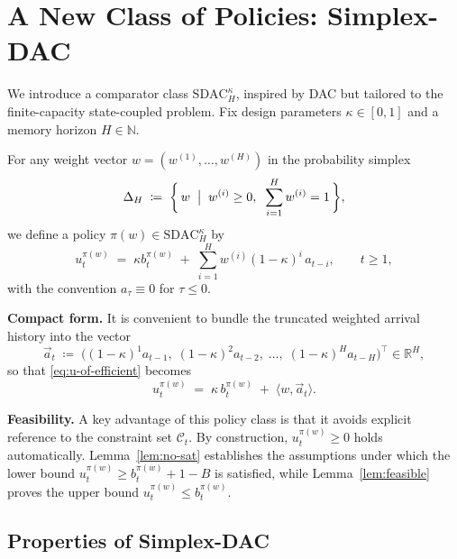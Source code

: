 \documentclass[11pt]{article}
\begin{document}
\section{A New Class of Policies: Simplex-DAC}

We introduce a comparator class \(\mathrm{SDAC}_H^\kappa\), inspired by DAC but tailored to the finite-capacity state-coupled problem.
Fix design parameters \(\kappa \in [0,1]\) and a memory horizon \(H \in \mathbb{N}\).  

For any weight vector \(w = (w^{(1)},\dots,w^{(H)})\) in the probability simplex
\[
\Delta_H \;\coloneqq\;
\biggl\{\,w \;\bigm|\; w^{(i)} \ge 0, \;\; \sum_{i=1}^H w^{(i)} = 1 \,\biggr\},
\]
we define a policy \(\pi(w) \in \mathrm{SDAC}_H^\kappa\) by
\begin{equation}\label{eq:u-of-efficient}
u_t^{\pi(w)} \;=\; \kappa b_t^{\pi(w)} \;+\; \sum_{i=1}^H w^{(i)} (1-\kappa)^i \, a_{t-i},
\qquad t \ge 1,
\end{equation}
with the convention \(a_\tau \equiv 0\) for \(\tau \le 0\).

\textbf{Compact form.}
It is convenient to bundle the truncated weighted arrival history into the vector
\[
\vec{a}_t
\;\coloneqq\;
\bigl((1-\kappa)^1 a_{t-1},\; (1-\kappa)^2 a_{t-2},\;\dots,\; (1-\kappa)^H a_{t-H}\bigr)^\top
\in \mathbb{R}^H ,
\]
so that \eqref{eq:u-of-efficient} becomes
\[
u_t^{\pi(w)} \;=\; \kappa\, b_t^{\pi(w)} \;+\; \langle w,\vec{a}_t\rangle.
\]



\textbf{Feasibility.}
A key advantage of this policy class is that it avoids explicit reference to the constraint set \(\mathcal{C}_t\).  
By construction, \(u_t^{\pi(w)} \ge 0\) holds automatically.  
Lemma~\ref{lem:no-sat} establishes the assumptions under which the lower bound \(u_t^{\pi(w)} \ge b_t^{\pi(w)} + 1 - B\) is satisfied, while Lemma~\ref{lem:feasible} proves the upper bound \(u_t^{\pi(w)} \le b_t^{\pi(w)}\).



\subsection{Properties of Simplex-DAC}
\end{document}
